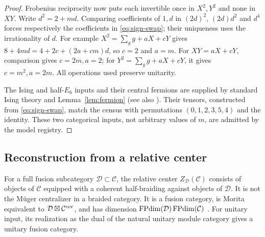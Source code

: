 \begin{proof}
Frobenius reciprocity now puts each invertible once in $X^2,Y^2$ and none
in $XY$. Write $d^2=2+md$. Comparing coefficients of $1,d$ in
$(2d)^2$, $(2d)d^2$ and $d^4$ forces respectively the coefficients in
\eqref{eq:sign-swap}; their uniqueness uses the irrationality of $d$.
For example $X^2=\sum_g g+aX+cY$ gives $8+4md=4+2c+(2a+cm)d$,
so $c=2$ and $a=m$. For $XY=aX+cY$, comparison gives $c=2m,a=2$;
for $Y^2=\sum_g g+aX+cY$, it gives $c=m^2,a=2m$.
All operations used preserve unitarity.

The Ising and half-$E_6$ inputs and their central fermions are supplied by
standard Ising theory and Lemma~\ref{lem:fermion} (see also \cite{ALW}).
Their tensors, constructed from \eqref{eq:sign-swap}, match the census
with permutations $(0,1,2,3,5,4)$ and the identity. These two categorical
inputs, not arbitrary values of $m$, are admitted by the model registry.
\end{proof}

\subsection{Reconstruction from a relative center}\label{sec:relative-fibonacci}
For a full fusion subcategory $\mathcal D\subset\mathcal C$, the relative
center $Z_{\mathcal D}(\mathcal C)$ consists of objects of $\mathcal C$
equipped with a coherent half-braiding against objects of $\mathcal D$.
It is not the M\"uger centralizer in a braided category. It is a fusion
category, is Morita equivalent to $\mathcal D\boxtimes\mathcal C^{\rm rev}$,
and has dimension $\operatorname{FPdim}(\mathcal D)\operatorname{FPdim}(\mathcal C)$
\cite[Remark~2.4]{GNNrel}. For unitary input, its realization as the dual
of the natural unitary module category gives a unitary fusion category.

